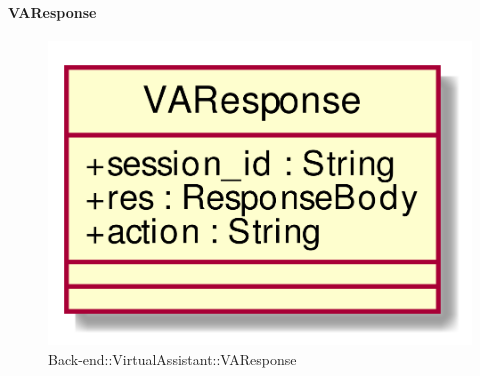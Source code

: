 \FloatBarrier

\hypertarget{VAResponse_label}{\paragraph{VAResponse}}
\begin{figure}[h]
	\centering
	\includegraphics[width=\textwidth,height=\textheight,keepaspectratio]{images/ClassVAResponse.png}
	\caption{Back-end::VirtualAssistant::VAResponse}
\end{figure}
